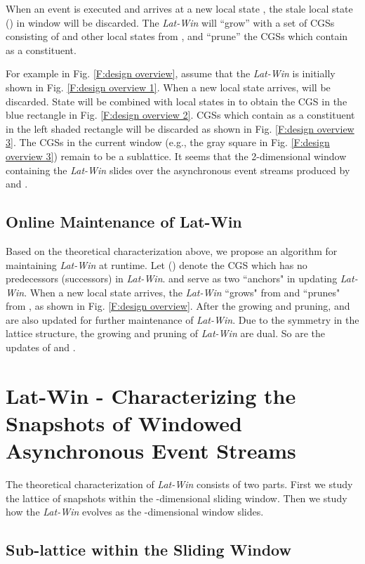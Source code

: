 \documentclass[12pt,journal,letterpaper,compsoc]{IEEEtran}
\begin{document}
When an event  is executed and  arrives at a new local state , the stale local state  () in window  will be discarded. The {\it Lat-Win} will ``grow'' with a set of CGSs consisting of  and other local states from , and ``prune'' the CGSs which contain  as a constituent.

For example in Fig. \ref{F:design overview}, assume that the {\it Lat-Win} is initially shown in Fig. \ref{F:design overview 1}. When a new local state  arrives,  will be discarded. State  will be combined with local states in  to obtain the CGS  in the blue rectangle in Fig. \ref{F:design overview 2}. CGSs which contain  as a constituent in the left shaded rectangle will be discarded as shown in Fig. \ref{F:design overview 3}. The CGSs in the current window (e.g., the gray square in Fig. \ref{F:design overview 3}) remain to be a sublattice. It seems that the 2-dimensional window containing the {\it Lat-Win} slides over the asynchronous event streams produced by  and .

\subsection{Online Maintenance of Lat-Win}

Based on the theoretical characterization above, we propose an algorithm for maintaining {\it Lat-Win} at runtime. Let  () denote the CGS which has no predecessors (successors) in {\it Lat-Win}.  and  serve as two ``anchors" in updating {\it Lat-Win}. When a new local state arrives, the {\it Lat-Win} ``grows" from  and ``prunes" from , as shown in Fig. \ref{F:design overview}. After the growing and pruning,  and  are also updated for further maintenance of {\it Lat-Win}. Due to the symmetry in the lattice structure, the growing and pruning of {\it Lat-Win} are dual. So are the updates of  and .

\section{Lat-Win - Characterizing the Snapshots of Windowed Asynchronous Event Streams}
\label{sec:characterization}

The theoretical characterization of {\it Lat-Win} consists of two parts. First we study the lattice of snapshots within the -dimensional sliding window. Then we study how the {\it Lat-Win} evolves as the -dimensional window slides.

\subsection{Sub-lattice within the Sliding Window}
\end{document}
